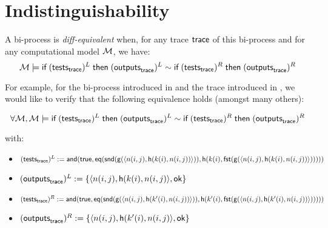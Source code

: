 \section{Indistinguishability}

\begin{definition}
  A bi-process is \emph{diff-equivalent} when, for any trace $\textsf{trace}$ of this bi-process and for any computational model $\mathcal{M}$, we have:
  $$\mathcal{M} \models \textsf{if}\; (\textsf{tests}_{\textsf{trace}})^L \;\textsf{then}\; (\textsf{outputs}_{\textsf{trace}})^L \sim \textsf{if}\; (\textsf{tests}_{\textsf{trace}})^R \;\textsf{then}\; (\textsf{outputs}_{\textsf{trace}})^R$$
\end{definition}

\begin{example}
  For example, for the bi-process introduced in  and the trace introduced in , we would like to verify that the following equivalence holds (amongst many others):

  $$\forall \mathcal{M}, \mathcal{M} \models \textsf{if}\; (\textsf{tests}_{\textsf{trace}})^L \;\textsf{then}\; (\textsf{outputs}_{\textsf{trace}})^L \sim \textsf{if}\; (\textsf{tests}_{\textsf{trace}})^R \;\textsf{then}\; (\textsf{outputs}_{\textsf{trace}})^R$$

  with:
  \begin{itemize}
    \item $(\textsf{tests}_{\textsf{trace}})^L := \mathsf{and}(\textsf{true}, \mathsf{eq}(\mathsf{snd}(\mathsf{g}(\langle n(i,j), \mathsf{h}(k(i),n(i,j)) \rangle)), \mathsf{h}( k(i), \mathsf{fst}( \mathsf{g}( \langle n(i,j), \mathsf{h}(k(i),n(i,j)) \rangle )))))$
    \item $(\textsf{outputs}_{\textsf{trace}})^L := \{ \langle n(i,j), \mathsf{h}(k(i),n(i,j) \rangle, \mathsf{ok} \}$
    \item $(\textsf{tests}_{\textsf{trace}})^R := \mathsf{and}(\textsf{true}, \mathsf{eq}(\mathsf{snd}(\mathsf{g}(\langle n(i,j), \mathsf{h}(k'(i),n(i,j)) \rangle)), \mathsf{h}( k'(i), \mathsf{fst}( \mathsf{g}( \langle n(i,j), \mathsf{h}(k'(i),n(i,j)) \rangle )))))$
    \item $(\textsf{outputs}_{\textsf{trace}})^R := \{ \langle n(i,j), \mathsf{h}(k'(i),n(i,j) \rangle, \mathsf{ok} \}$
  \end{itemize}
\end{example}

